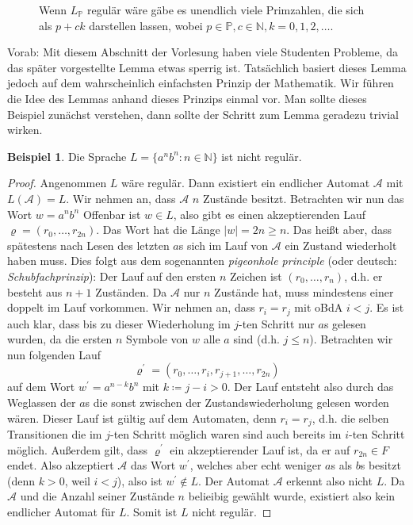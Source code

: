 \documentclass[11pt, a4paper]{article}
\theoremstyle{definition}
\newtheorem{example}[definition]{Beispiel}
\theoremstyle{plain}
\numberwithin{equation}{section}
\begin{document}
\begin{figure}
	\centering
	
	\caption{Wenn \( L_\mathbb{P} \) regulär wäre gäbe es unendlich viele Primzahlen, die sich als \( p + ck \) darstellen lassen, wobei \( p \in \mathbb{P}, c \in \mathbb{N}, k = 0, 1, 2, \ldots \).}
	\label{fig:dfa_primes}
\end{figure}
Vorab: Mit diesem Abschnitt der Vorlesung haben viele Studenten Probleme, da das später vorgestellte Lemma etwas sperrig ist. Tatsächlich basiert dieses Lemma jedoch auf dem wahrscheinlich einfachsten Prinzip der Mathematik. Wir führen die Idee des Lemmas anhand dieses Prinzips einmal vor. Man sollte dieses Beispiel zunächst verstehen, dann sollte der Schritt zum Lemma geradezu trivial wirken.
\begin{example}\label{exp:pumping1}
	Die Sprache \( L = \{a^n b^n : n \in \mathbb{N} \} \) ist nicht regulär.
	\begin{proof}
		Angenommen \( L \) wäre regulär. Dann existiert ein endlicher Automat \( \mathcal{A} \) mit \( L(\mathcal{A}) = L \). Wir nehmen an, dass \( \mathcal{A} \) \( n \) Zustände besitzt. Betrachten wir nun das Wort \( w = a^n b^n \) Offenbar ist \( w \in L \), also gibt es einen akzeptierenden Lauf \( \varrho = (r_0, \ldots, r_{2n}) \). Das Wort hat die Länge \( \left| w \right| = 2n \geq n \). Das heißt aber, dass spätestens nach Lesen des letzten \( a \)s sich im Lauf von \( \mathcal{A} \) ein Zustand wiederholt haben muss. Dies folgt aus dem sogenannten \textit{pigeonhole principle} (oder deutsch: \textit{Schubfachprinzip}): Der Lauf auf den ersten \( n \) Zeichen ist \( (r_0, \ldots, r_n) \), d.h. er besteht aus \( n+1 \) Zuständen. Da \( \mathcal{A} \) nur \( n \) Zustände hat, muss mindestens einer doppelt im Lauf vorkommen. Wir nehmen an, dass \( r_i = r_j \) mit oBdA \( i < j \). Es ist auch klar, dass bis zu dieser Wiederholung im \(j\)-ten Schritt nur \( a \)s gelesen wurden, da die ersten \( n \) Symbole von \( w \) alle \( a \) sind (d.h. \( j \leq n \)). Betrachten wir nun folgenden Lauf
		\[
			\varrho^\prime = (r_0, \ldots, r_i, r_{j+1}, \ldots, r_{2n})
		\]
		auf dem Wort \( w^\prime = a^{n-k}b^n \) mit \( k \coloneqq j-i > 0 \). Der Lauf entsteht also durch das Weglassen der \( a \)s die sonst zwischen der Zustandswiederholung gelesen worden wären. Dieser Lauf ist gültig auf dem Automaten, denn \( r_i = r_j \), d.h. die selben Transitionen die im \(j\)-ten Schritt möglich waren sind auch bereits im \(i\)-ten Schritt möglich. Außerdem gilt, dass \( \varrho^\prime \) ein akzeptierender Lauf ist, da er auf \( r_{2n} \in F \) endet. Also akzeptiert \( \mathcal{A} \) das Wort \( w^\prime \), welches aber echt weniger \( a \)s als \( b \)s besitzt (denn \( k > 0 \), weil \( i < j \)), also ist \( w^\prime \notin L \). Der Automat \( \mathcal{A} \) erkennt also nicht \( L \). Da \( \mathcal{A} \) und die Anzahl seiner Zustände \( n \) belieibig gewählt wurde, existiert also kein endlicher Automat für \( L \). Somit ist \( L \) nicht regulär.
	\end{proof}
\end{example}
\end{document}
